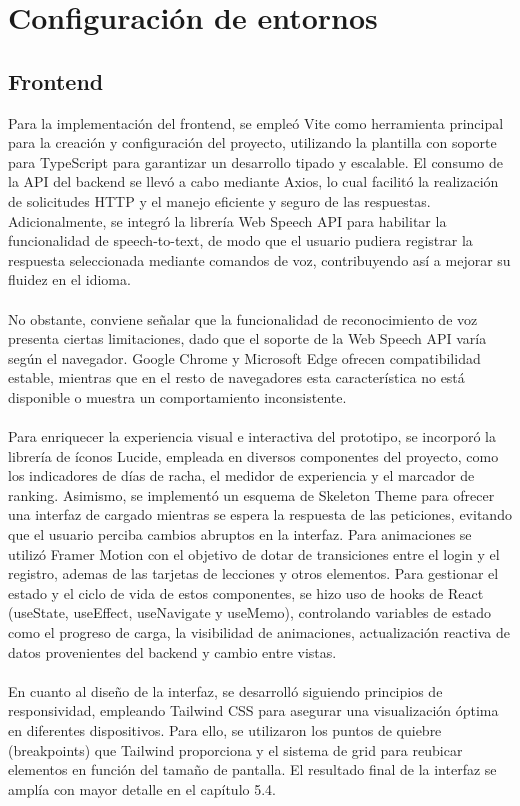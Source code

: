 \section{Configuración de entornos}
\subsection{Frontend}

Para la implementación del frontend, se empleó Vite como herramienta principal para la creación y configuración del proyecto, utilizando la plantilla con soporte para TypeScript para garantizar un desarrollo tipado y escalable. El consumo de la API del backend se llevó a cabo mediante Axios, lo cual facilitó la realización de solicitudes HTTP y el manejo eficiente y seguro de las respuestas. Adicionalmente, se integró la librería Web Speech API para habilitar la funcionalidad de speech-to-text, de modo que el usuario pudiera registrar la respuesta seleccionada mediante comandos de voz, contribuyendo así a mejorar su fluidez en el idioma.
\\
\\
No obstante, conviene señalar que la funcionalidad de reconocimiento de voz presenta ciertas limitaciones, dado que el soporte de la Web Speech API varía según el navegador. Google Chrome y Microsoft Edge ofrecen compatibilidad estable, mientras que en el resto de navegadores esta característica no está disponible o muestra un comportamiento inconsistente.
\\
\\
Para enriquecer la experiencia visual e interactiva del prototipo, se incorporó la librería de íconos Lucide, empleada en diversos componentes del proyecto, como los indicadores de días de racha, el medidor de experiencia y el marcador de ranking. Asimismo, se implementó un esquema de Skeleton Theme para ofrecer una interfaz de cargado mientras se espera la respuesta de las peticiones, evitando que el usuario perciba cambios abruptos en la interfaz. Para animaciones se utilizó Framer Motion con el objetivo de dotar de transiciones entre el login y el registro, ademas de las tarjetas de lecciones y otros elementos. Para gestionar el estado y el ciclo de vida de estos componentes, se hizo uso de hooks de React (useState, useEffect, useNavigate y useMemo), controlando variables de estado como el progreso de carga, la visibilidad de animaciones, actualización reactiva de datos provenientes del backend y cambio entre vistas.
\\
\\
En cuanto al diseño de la interfaz, se desarrolló siguiendo principios de responsividad, empleando Tailwind CSS para asegurar una visualización óptima en diferentes dispositivos. Para ello, se utilizaron los puntos de quiebre (breakpoints) que Tailwind proporciona y el sistema de grid para reubicar elementos en función del tamaño de pantalla. El resultado final de la interfaz se amplía con mayor detalle en el capítulo 5.4.

